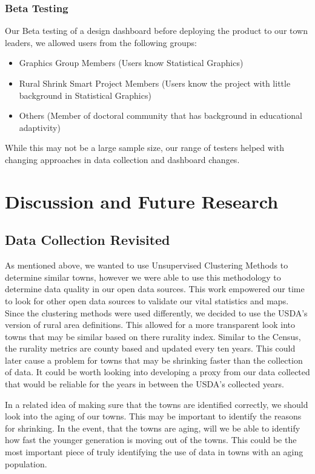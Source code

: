 \documentclass[letterpaper,inpress]{jdsart}
\begin{document}
\subsubsection{Beta Testing}

Our Beta testing of a design dashboard before deploying the product to our town leaders, we allowed users from the following groups:

\begin{itemize}
    \item Graphics Group Members (Users know Statistical Graphics)
    \item Rural Shrink Smart Project Members (Users know the project with little background in Statistical Graphics)
    \item  Others (Member of doctoral community that has background in educational adaptivity)
\end{itemize}

While this may not be a large sample size, our range of testers helped with changing approaches in data collection and dashboard changes.

\section{Discussion and Future Research}

\subsection{Data Collection Revisited}

As mentioned above, we wanted to use Unsupervised Clustering Methods to determine similar towns, however we were able to use this methodology to determine data quality in our open data sources. This work empowered our time to look for other open data sources to validate our vital statistics and maps. Since the clustering methods were used differently, we decided to use the USDA's version of rural area definitions. This allowed for a more transparent look into towns that may be similar based on there rurality index. Similar to the Census, the rurality metrics are county based and updated every ten years. This could later cause a problem for towns that may be shrinking faster than the collection of data. It could be worth looking into developing a proxy from our data collected that would be reliable for the years in between the USDA's collected years.

In a related idea of making sure that the towns are identified correctly, we should look into the aging of our towns. This may be important to identify the reasons for shrinking. In the event, that the towns are aging, will we be able to identify how fast the younger generation is moving out of the towns. This could be the most important piece of truly identifying the use of data in towns with an aging population.
\end{document}
